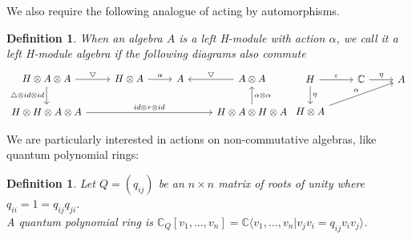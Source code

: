 \documentclass[12pt,a4paper]{article}
\newtheorem{definition}[theorem]{Definition}
\newcommand\1{_{(1)}}
\newcommand\2{_{(2)}}
\begin{document}
We also require the following analogue of acting by automorphisms.

\begin{definition}
When an algebra $A$ is a left H-module with action $\alpha$, we call it a left H-module algebra if the following diagrams also commute
\[
\begin{tikzcd}
H\otimes A\otimes A \arrow[r, "\bigtriangledown"] \arrow[d, "\triangle\otimes id\otimes id"'] & H\otimes A \arrow[r, "\alpha"] & A & A\otimes A \arrow[l, "\bigtriangledown"']                         \\
H\otimes H\otimes A\otimes A \arrow[rrr, "id\otimes\tau\otimes id"]                        &                                &   & H\otimes A\otimes H\otimes A \arrow[u, "\alpha\otimes\alpha"']
\end{tikzcd}
\begin{tikzcd}
H \arrow[r, "\varepsilon"] \arrow[d, "\eta"] & \mathbb{C} \arrow[r, "\eta"] & A \\
H\otimes A \arrow[rru, "\alpha"]             &                       &  
\end{tikzcd}
\]
\end{definition}

We are particularly interested in actions on non-commutative algebras, like quantum polynomial rings:

\begin{definition}
Let $Q=(q_{ij})$ be an $n\times n$ matrix of roots of unity where $q_{ii}=1=q_{ij}q_{ji}$.
\\A quantum polynomial ring is $\mathbb{C}_Q[v_1,\ldots,v_n]=\mathbb{C}\langle v_1,\ldots,v_n\vert v_jv_i=q_{ij}v_iv_j\rangle$.
\end{definition}
\end{document}
